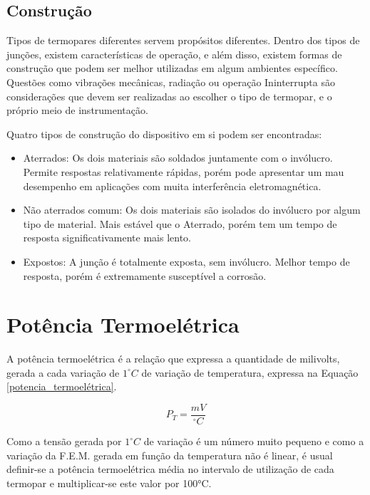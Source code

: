 \documentclass[a4paper,12pt]{report}
\begin{document}
	\subsection{Construção}
	
	Tipos de termopares diferentes servem propósitos diferentes. Dentro dos tipos de junções, existem características de operação, e além disso, existem formas de construção que podem ser melhor utilizadas em algum ambientes específico. Questões como vibrações mecânicas, radiação ou operação Ininterrupta são considerações que devem ser realizadas ao escolher o tipo de termopar, e o próprio meio de instrumentação.
	
	Quatro tipos de construção do dispositivo em si podem ser encontradas:
	
	\begin{itemize}
		\item Aterrados: Os dois materiais são soldados juntamente com o invólucro. Permite respostas relativamente rápidas, porém pode apresentar um mau desempenho em aplicações com muita interferência eletromagnética.
		
		\item Não aterrados comum: Os dois materiais são isolados do invólucro por algum tipo de material. Mais estável que o Aterrado, porém tem um tempo de resposta significativamente mais lento.
		
		\item Expostos: A junção é totalmente exposta, sem invólucro. Melhor tempo de resposta, porém é extremamente susceptível a corrosão.
	\end{itemize}
	
	\section{Potência Termoelétrica}

	A potência termoelétrica é a relação que expressa a quantidade de milivolts, gerada a cada variação de $1^{\circ}C$ de variação de temperatura, expressa na Equação \ref{potencia_termoelétrica}.
	
	\begin{equation}
		P_{T} = \frac{mV}{^{\circ}C}
		\label{potencia_termoelétrica}
	\end{equation}

	\singlespacing

	Como a tensão gerada por $1^{\circ}C$ de variação é um número muito pequeno e como a variação da F.E.M. gerada em função da temperatura não é linear, é usual definir-se a potência termoelétrica média no intervalo de utilização de cada termopar e multiplicar-se este valor por 100°C.
\end{document}

